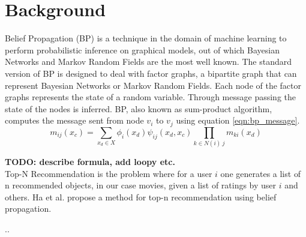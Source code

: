\section{Background}\label{sec:background}


Belief Propagation (BP) is a technique in the domain of machine learning to perform probabilistic inference on graphical models, out of which Bayesian Networks and Markov Random Fields are the most well known. The standard version of BP is designed to deal with factor graphs, a bipartite graph that can represent Bayesian Networks or Markov Random Fields. Each node of the factor graphs represents the state of a random variable. Through message passing the state of the nodes is inferred. BP, also known as sum-product algorithm, computes the message sent from node $v_i$ to $v_j$ using equation \ref{eqn:bp_message}.
\begin{equation}                                                            
\label{eqn:bp_message}
m_{ij}(x_c) = \sum_{x_d \in X}\phi_i(x_d)\psi_{ij}(x_d,x_c)\prod_{k \in N(i) \ j}m_{ki}(x_d)
\end{equation}

\textbf{TODO: describe formula, add loopy etc.} \\


Top-N Recommendation is the problem where for a user $i$ one generates a list of n recommended objects, in our case movies, given a list of ratings by user $i$ and others. Ha et al. \cite{Ha:2012:TRT:2396761.2398636} propose a method for top-n recommendation using belief propagation.

..

%
%
%
